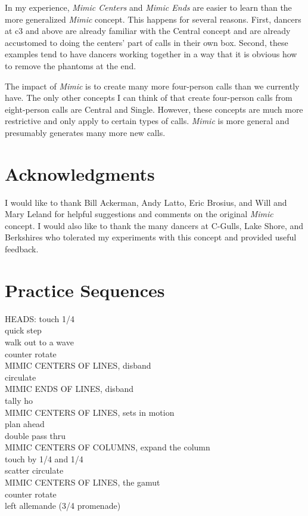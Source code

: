 \documentclass[12pt]{article}
\begin{document}
In my experience, \emph{Mimic Centers} and \emph{Mimic Ends} are
easier to learn than the more generalized \emph{Mimic} concept.
This happens for several reasons.  First, dancers at c3 and above
are already familiar with the Central concept and are already accustomed to
doing the centers' part of calls in their own box.  Second, these
examples tend to have dancers working together in a way that it is
obvious how to remove the phantoms at the end.

The impact of \emph{Mimic} is to create many more four-person calls
than we currently have.  The only other concepts I can think of
that create four-person calls from eight-person calls are Central
and Single.  However, these concepts are much more restrictive and
only apply to certain types of calls.  \emph{Mimic} is more general and
presumably generates many more new calls.

\section{Acknowledgments}

I would like to thank Bill Ackerman, Andy Latto, Eric Brosius,
and Will and Mary Leland
for helpful suggestions and comments on the original \emph{Mimic} concept.
I would also like to thank the many dancers at C-Gulls, Lake Shore,
and Berkshires who tolerated my experiments with this concept and
provided useful feedback.

\newpage
\section*{Practice Sequences}
\bigskip
{}
HEADS: touch 1/4\\
quick step\\
walk out to a wave\\
counter rotate\\
MIMIC CENTERS OF LINES, disband\\
circulate\\
MIMIC ENDS OF LINES, disband\\
tally ho\\
MIMIC CENTERS OF LINES, sets in motion\\
plan ahead\\
double pass thru\\
MIMIC CENTERS OF COLUMNS, expand the column\\
touch by 1/4 and 1/4\\
scatter circulate\\
MIMIC CENTERS OF LINES, the gamut\\
counter rotate\\
left allemande  (3/4 promenade)\\
\endsequence
\end{document}
